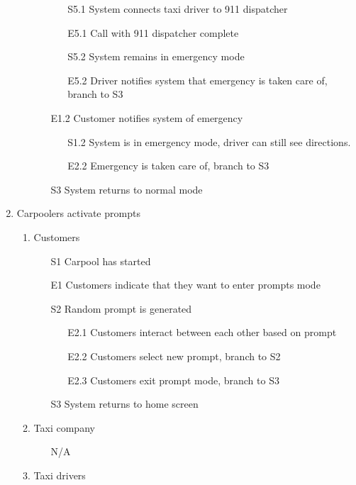 \documentclass[]{article}
\begin{document}
\begin{enumerate}[{BE}1.]
\begin{enumerate}[{VP6}.1]
\begin{enumerate}
				\begin{enumerate}
					\item[S5.1] System connects taxi driver to 911 dispatcher
					\item[E5.1] Call with 911 dispatcher complete
					\item[S5.2] System remains in emergency mode
					\item[E5.2] Driver notifies system that emergency is taken care of, branch to S3
					\end{enumerate}
				\item[E1.2] Customer notifies system of emergency
				\begin{enumerate}
					\item[S1.2] System is in emergency mode, driver can still see directions.
					\item[E2.2] Emergency is taken care of, branch to S3
				\end{enumerate}
				\item[S3] System returns to normal mode
			\end{enumerate}
	\end{enumerate}
	\item Carpoolers activate prompts
	\begin{enumerate}[{VP7}.1]
		\item Customers
			\begin{enumerate}
				\item[S1] Carpool has started
				\item[E1] Customers indicate that they want to enter prompts mode
				\item[S2] Random prompt is generated
				\begin{enumerate}
					\item[E2.1] Customers interact between each other based on prompt
					\item[E2.2] Customers select new prompt, branch to S2
					\item[E2.3] Customers exit prompt mode, branch to S3
				\end{enumerate}
				\item[S3] System returns to home screen
			\end{enumerate}
		\item Taxi company
			\begin{enumerate}
				\item[N/A]
			\end{enumerate}
		\item Taxi drivers
			\begin{enumerate}

\end{enumerate}
\end{enumerate}
\end{enumerate}
\end{document}
